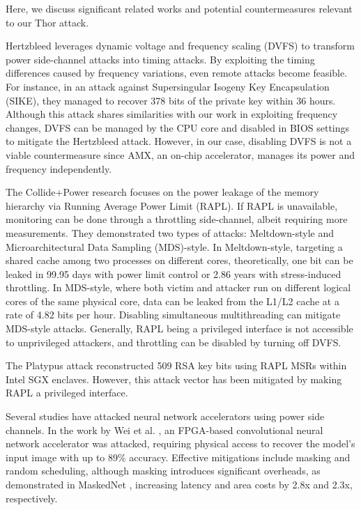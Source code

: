 Here, we discuss significant related works and potential countermeasures relevant to our Thor attack.

Hertzbleed leverages dynamic voltage and frequency scaling (DVFS) to transform power side-channel attacks into timing attacks. By exploiting the timing differences caused by frequency variations, even remote attacks become feasible. For instance, in an attack against Supersingular Isogeny Key Encapsulation (SIKE), they managed to recover 378 bits of the private key within 36 hours. Although this attack shares similarities with our work in exploiting frequency changes, DVFS can be managed by the CPU core and disabled in BIOS settings to mitigate the Hertzbleed attack. However, in our case, disabling DVFS is not a viable countermeasure since AMX, an on-chip accelerator, manages its power and frequency independently.

The Collide+Power research focuses on the power leakage of the memory hierarchy via Running Average Power Limit (RAPL). If RAPL is unavailable, monitoring can be done through a throttling side-channel, albeit requiring more measurements. They demonstrated two types of attacks: Meltdown-style and Microarchitectural Data Sampling (MDS)-style. In Meltdown-style, targeting a shared cache among two processes on different cores, theoretically, one bit can be leaked in 99.95 days with power limit control or 2.86 years with stress-induced throttling. In MDS-style, where both victim and attacker run on different logical cores of the same physical core, data can be leaked from the L1/L2 cache at a rate of 4.82 bits per hour. Disabling simultaneous multithreading can mitigate MDS-style attacks. Generally, RAPL being a privileged interface is not accessible to unprivileged attackers, and throttling can be disabled by turning off DVFS.

The Platypus attack reconstructed 509 RSA key bits using RAPL MSRs within Intel SGX enclaves. However, this attack vector has been mitigated by making RAPL a privileged interface.

Several studies have attacked neural network accelerators using power side channels. In the work by Wei et al. \cite{wei2018know}, an FPGA-based convolutional neural network accelerator was attacked, requiring physical access to recover the model's input image with up to 89\% accuracy. Effective mitigations include masking and random scheduling, although masking introduces significant overheads, as demonstrated in MaskedNet \cite{dubey2020maskednet}, increasing latency and area costs by 2.8x and 2.3x, respectively.

